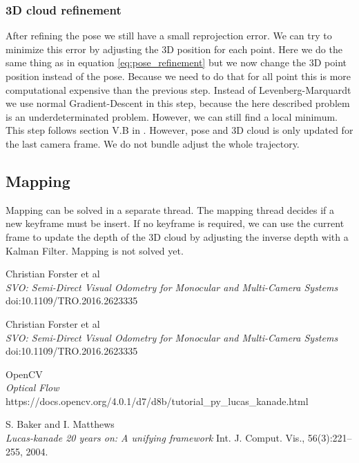 \documentclass[11pt,a4paper,titlepage,oneside]{report}
\begin{document}
\subsubsection{3D cloud refinement}
After refining the pose we still have a small reprojection error. We can try to minimize this error by adjusting the 3D position for each point. Here we do the same thing as in equation \ref{eq:pose_refinement} but we now change the 3D point position instead of the pose. Because we need to do that for all point this is more computational expensive than the previous step. Instead of Levenberg-Marquardt we use normal Gradient-Descent in this step, because the here described problem is an underdeterminated problem. However, we can still find a local minimum. This step follows section V.B in \cite{svo2}. However, pose and 3D cloud is only updated for the last camera frame. We do not bundle adjust the whole trajectory.

\subsection{Mapping}

Mapping can be solved in a separate thread. The mapping thread decides if a new keyframe must be insert. If no keyframe is required, we can use the current frame to update the depth of the 3D cloud by adjusting the inverse depth with a Kalman Filter. Mapping is not solved yet.

\begin{thebibliography}{1}

	Christian Forster et al\\
	\textit{SVO: Semi-Direct Visual Odometry for Monocular and Multi-Camera Systems}\\
	doi:10.1109/TRO.2016.2623335

	Christian Forster et al\\
	\textit{SVO: Semi-Direct Visual Odometry for Monocular and Multi-Camera Systems}\\
	doi:10.1109/TRO.2016.2623335

	OpenCV\\
	\textit{Optical Flow}\\
	https://docs.opencv.org/4.0.1/d7/d8b/tutorial\_py\_lucas\_kanade.html


	S. Baker and I. Matthews\\
	\textit{Lucas-kanade 20 years on: A unifying framework}
	Int. J. Comput. Vis., 56(3):221–255, 2004.


\end{thebibliography}
\end{document}
